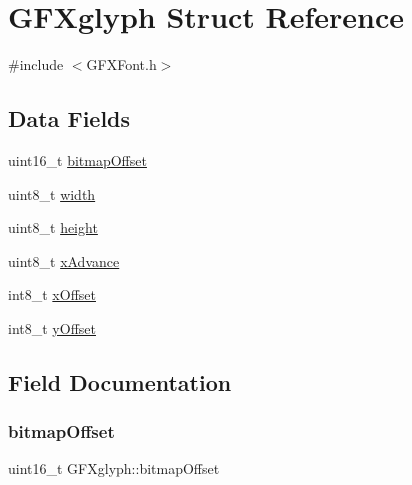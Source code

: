\hypertarget{struct_g_f_xglyph}{}\section{G\+F\+Xglyph Struct Reference}
\label{struct_g_f_xglyph}


{\ttfamily \#include $<$G\+F\+X\+Font.\+h$>$}

\subsection*{Data Fields}
\begin{DoxyCompactItemize}
\item 
uint16\+\_\+t \mbox{\hyperlink{struct_g_f_xglyph_a24d52036821c10af52a742a1d7fbd9b8}{bitmap\+Offset}}
\item 
uint8\+\_\+t \mbox{\hyperlink{struct_g_f_xglyph_a02bd34fd474af250b230f52cee75a6c1}{width}}
\item 
uint8\+\_\+t \mbox{\hyperlink{struct_g_f_xglyph_a24cff650b78fc295dc46e1bfa9127bb7}{height}}
\item 
uint8\+\_\+t \mbox{\hyperlink{struct_g_f_xglyph_a9b191040252aa9b5362087d65366bbf2}{x\+Advance}}
\item 
int8\+\_\+t \mbox{\hyperlink{struct_g_f_xglyph_ab030bd9aeb37509ccc94ae3dcec4de98}{x\+Offset}}
\item 
int8\+\_\+t \mbox{\hyperlink{struct_g_f_xglyph_a96b2c0dbe314bf053cdc0d5c622e76a7}{y\+Offset}}
\end{DoxyCompactItemize}


\subsection{Field Documentation}
\mbox{\label{struct_g_f_xglyph_a24d52036821c10af52a742a1d7fbd9b8}} 
\subsubsection{\texorpdfstring{bitmap\+Offset}{bitmapOffset}}
{\footnotesize\ttfamily uint16\+\_\+t G\+F\+Xglyph\+::bitmap\+Offset}

\mbox{\label{struct_g_f_xglyph_a24cff650b78fc295dc46e1bfa9127bb7}} 
